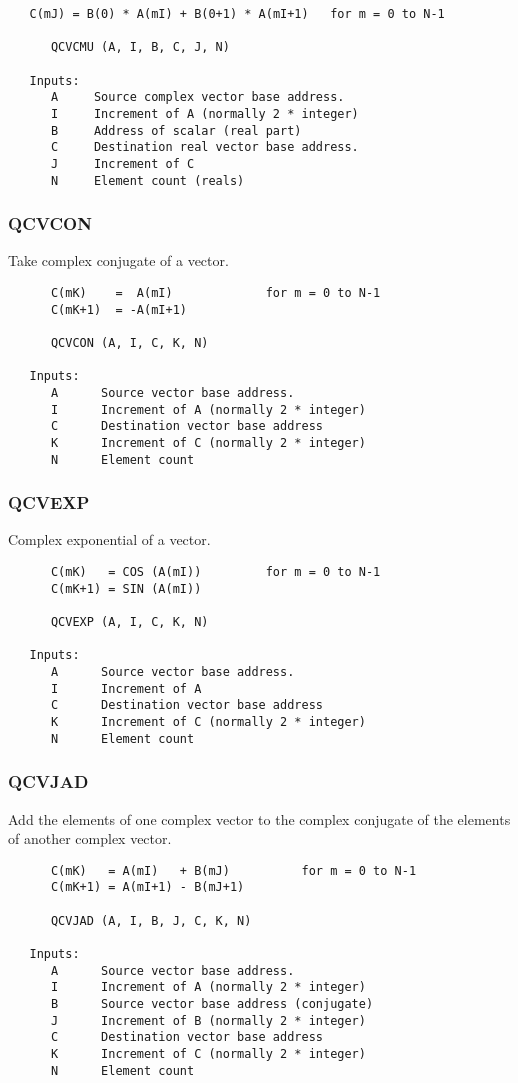 \begin{verbatim}
   C(mJ) = B(0) * A(mI) + B(0+1) * A(mI+1)   for m = 0 to N-1

      QCVCMU (A, I, B, C, J, N)

   Inputs:
      A     Source complex vector base address.
      I     Increment of A (normally 2 * integer)
      B     Address of scalar (real part)
      C     Destination real vector base address.
      J     Increment of C
      N     Element count (reals)

\end{verbatim}
\subsubsection{QCVCON }
Take complex conjugate of a vector.

\begin{verbatim}
      C(mK)    =  A(mI)             for m = 0 to N-1
      C(mK+1)  = -A(mI+1)

      QCVCON (A, I, C, K, N)

   Inputs:
      A      Source vector base address.
      I      Increment of A (normally 2 * integer)
      C      Destination vector base address
      K      Increment of C (normally 2 * integer)
      N      Element count

\end{verbatim}
\subsubsection{QCVEXP }
Complex exponential of a vector.

\begin{verbatim}
      C(mK)   = COS (A(mI))         for m = 0 to N-1
      C(mK+1) = SIN (A(mI))

      QCVEXP (A, I, C, K, N)

   Inputs:
      A      Source vector base address.
      I      Increment of A
      C      Destination vector base address
      K      Increment of C (normally 2 * integer)
      N      Element count

\end{verbatim}
\subsubsection{QCVJAD }
Add the elements of one complex vector to the complex conjugate of
the elements of another complex vector.

\begin{verbatim}
      C(mK)   = A(mI)   + B(mJ)          for m = 0 to N-1
      C(mK+1) = A(mI+1) - B(mJ+1)

      QCVJAD (A, I, B, J, C, K, N)

   Inputs:
      A      Source vector base address.
      I      Increment of A (normally 2 * integer)
      B      Source vector base address (conjugate)
      J      Increment of B (normally 2 * integer)
      C      Destination vector base address
      K      Increment of C (normally 2 * integer)
      N      Element count

\end{verbatim}
